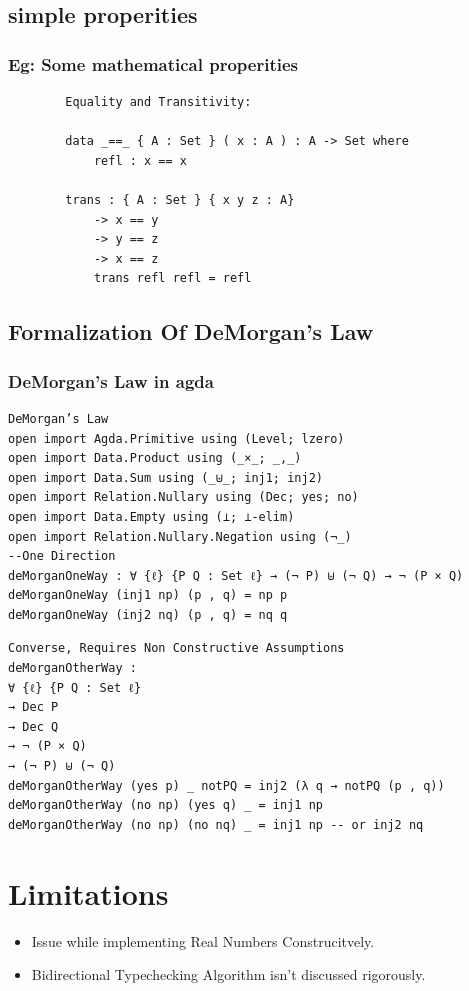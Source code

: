 \documentclass[aspectratio=169, 12pt]{beamer}
\begin{document}
\subsection*{simple properities  } 
\begin{frame}[fragile]
    \frametitle{Eg: Some mathematical properities }
    \begin{verbatim}
        Equality and Transitivity: 

        data _==_ { A : Set } ( x : A ) : A -> Set where
            refl : x == x

        trans : { A : Set } { x y z : A}
            -> x == y
            -> y == z
            -> x == z
            trans refl refl = refl
    \end{verbatim}
\end{frame}
\subsection{Formalization Of DeMorgan's Law} 
\begin{frame}[fragile]
    \frametitle{DeMorgan's Law in agda}
   \footnotesize \begin{verbatim}
DeMorgan’s Law
open import Agda.Primitive using (Level; lzero)
open import Data.Product using (_×_; _,_)
open import Data.Sum using (_⊎_; inj1; inj2)
open import Relation.Nullary using (Dec; yes; no)
open import Data.Empty using (⊥; ⊥-elim)
open import Relation.Nullary.Negation using (¬_)
--One Direction
deMorganOneWay : ∀ {ℓ} {P Q : Set ℓ} → (¬ P) ⊎ (¬ Q) → ¬ (P × Q)
deMorganOneWay (inj1 np) (p , q) = np p
deMorganOneWay (inj2 nq) (p , q) = nq q

    \end{verbatim}
    
\end{frame}
\begin{frame}[fragile]

    \small \begin{verbatim}
Converse, Requires Non Constructive Assumptions
deMorganOtherWay :
∀ {ℓ} {P Q : Set ℓ}
→ Dec P
→ Dec Q
→ ¬ (P × Q)
→ (¬ P) ⊎ (¬ Q)
deMorganOtherWay (yes p) _ notPQ = inj2 (λ q → notPQ (p , q))
deMorganOtherWay (no np) (yes q) _ = inj1 np
deMorganOtherWay (no np) (no nq) _ = inj1 np -- or inj2 nq
    \end{verbatim}
    
\end{frame}
\section{ Limitations}
\begin{frame}{}
    \begin{itemize}
        \item Issue while implementing Real Numbers Construcitvely.
        \item Bidirectional Typechecking Algorithm isn't discussed rigorously.
        

    \end{itemize}
\end{frame} 
\end{document}

